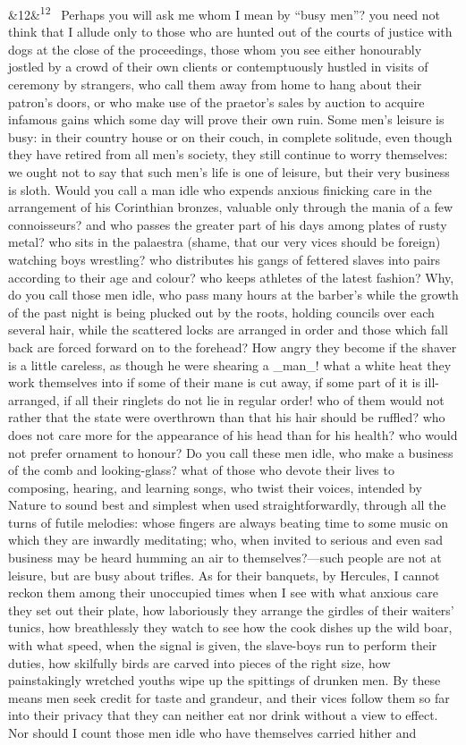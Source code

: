\documentclass[12pt]{article}
\newcommand{\para}[1][]{\par\noindent\ifx&#1&\else\textsuperscript{\footnotesize #1}~\fi}
\begin{document}
\para[12] Perhaps you will ask me whom I mean by “busy men”? you need not think that I allude only to those who are hunted out of the courts of justice with dogs at the close of the proceedings, those whom you see either honourably jostled by a crowd of their own clients or contemptuously hustled in visits of ceremony by strangers, who call them away from home to hang about their patron’s doors, or who make use of the praetor’s sales by auction to acquire infamous gains which some day will prove their own ruin. Some men’s leisure is busy: in their country house or on their couch, in complete solitude, even though they have retired from all men’s society, they still continue to worry themselves: we ought not to say that such men’s life is one of leisure, but their very business is sloth. Would you call a man idle who expends anxious finicking care in the arrangement of his Corinthian bronzes, valuable only through the mania of a few connoisseurs? and who passes the greater part of his days among plates of rusty metal? who sits in the palaestra (shame, that our very vices should be foreign) watching boys wrestling? who distributes his gangs of fettered slaves into pairs according to their age and colour? who keeps athletes of the latest fashion? Why, do you call those men idle, who pass many hours at the barber’s while the growth of the past night is being plucked out by the roots, holding councils over each several hair, while the scattered locks are arranged in order and those which fall back are forced forward on to the forehead? How angry they become if the shaver is a little careless, as though he were shearing a \_man\_! what a white heat they work themselves into if some of their mane is cut away, if some part of it is ill-arranged, if all their ringlets do not lie in regular order! who of them would not rather that the state were overthrown than that his hair should be ruffled? who does not care more for the appearance of his head than for his health? who would not prefer ornament to honour? Do you call these men idle, who make a business of the comb and looking-glass? what of those who devote their lives to composing, hearing, and learning songs, who twist their voices, intended by Nature to sound best and simplest when used straightforwardly, through all the turns of futile melodies: whose fingers are always beating time to some music on which they are inwardly meditating; who, when invited to serious and even sad business may be heard humming an air to themselves?—such people are not at leisure, but are busy about trifles. As for their banquets, by Hercules, I cannot reckon them among their unoccupied times when I see with what anxious care they set out their plate, how laboriously they arrange the girdles of their waiters’ tunics, how breathlessly they watch to see how the cook dishes up the wild boar, with what speed, when the signal is given, the slave-boys run to perform their duties, how skilfully birds are carved into pieces of the right size, how painstakingly wretched youths wipe up the spittings of drunken men. By these means men seek credit for taste and grandeur, and their vices follow them so far into their privacy that they can neither eat nor drink without a view to effect. Nor should I count those men idle who have themselves carried hither and 
\end{document}
